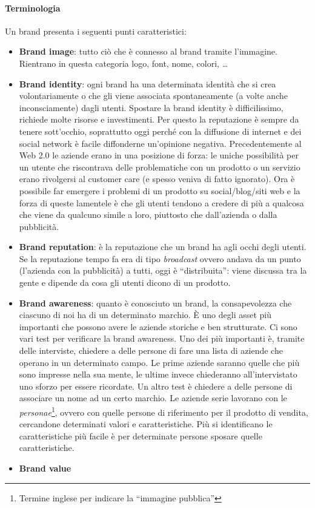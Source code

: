 \paragraph*{Terminologia} Un brand presenta i seguenti punti caratteristici:
\begin{itemize}
 \item \textbf{Brand image}: tutto ciò che è connesso al brand tramite
 l'immagine. Rientrano in questa categoria logo, font, nome, colori, \dots{}
 \item \textbf{Brand identity}: ogni brand ha una determinata identità che si
 crea volontariamente o che gli viene associata spontaneamente (a volte anche
 inconsciamente) dagli utenti.
 Spostare la brand identity è difficilissimo, richiede molte risorse e
 investimenti.
 Per questo la reputazione è sempre da tenere sott'occhio, soprattutto oggi
 perché con la diffusione di internet e dei social network è facile diffonderne
 un'opinione negativa.
 Precedentemente al Web 2.0 le aziende erano in una posizione di forza: le
 uniche possibilità per un utente che riscontrava delle problematiche con un
 prodotto o un servizio erano rivolgersi al customer care (e spesso veniva
 di fatto ignorato). Ora è possibile far emergere i problemi di un prodotto su
 social/blog/siti web e la forza di queste lamentele è che gli utenti tendono a
 credere di più a qualcosa che viene da qualcuno simile a loro, piuttosto che
 dall'azienda o dalla pubblicità.
 \item \textbf{Brand reputation}: è la reputazione che un brand ha agli occhi
 degli utenti. Se la reputazione tempo fa era di tipo \textit{broadcast} ovvero
 andava da un punto (l'azienda con la pubblicità) a tutti, oggi è
 ``distribuita'': viene discussa tra la gente e dipende da cosa gli utenti
 dicono di un prodotto.
 \item \textbf{Brand awareness}: quanto è conosciuto un brand, la
 consapevolezza che ciascuno di noi ha di un determinato marchio.
 È uno degli asset più importanti che possono avere le aziende storiche e ben
 strutturate.
 Ci sono vari test per verificare la brand awareness. Uno dei più importanti è,
 tramite delle interviste, chiedere a delle persone di fare una lista di
 aziende che operano in un determinato campo. Le prime aziende saranno quelle
 che più sono impresse nella sua mente, le ultime invece chiederanno
 all'intervistato uno sforzo per essere ricordate. Un altro test è chiedere a
 delle persone di associare un nome ad un certo marchio.
 Le aziende serie lavorano con le \textit{personae}\footnote{Termine inglese 
 per indicare la ``immagine pubblica''}, ovvero con quelle persone di 
 riferimento per  il prodotto di vendita, cercandone determinati valori e 
 caratteristiche.
 Più si identificano le caratteristiche più facile è per determinate persone
 sposare quelle caratteristiche.
 \item \textbf{Brand value}
\end{itemize}
